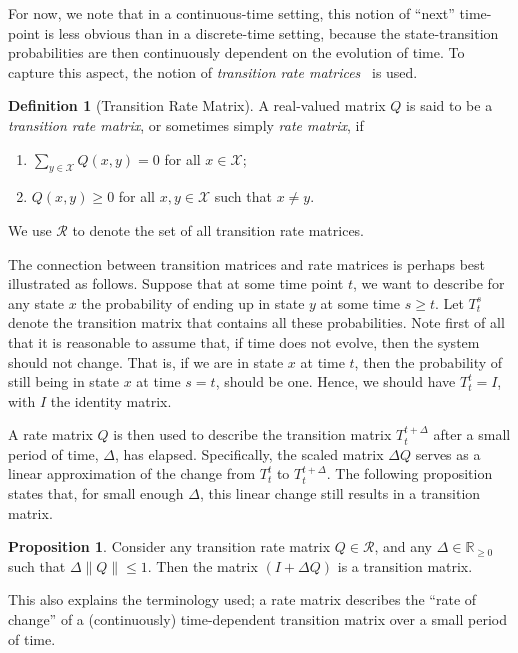 \documentclass[10pt,a4paper]{paper}
\theoremstyle{definition}
\newtheorem{proposition}[theorem]{Proposition}
\newtheorem{definition}{Definition}
\newcommand{\reals}{\mathbb{R}}
\newcommand{\realsnonneg}{\reals_{\geq 0}}
\newcommand{\states}{\mathcal{X}}
\newcommand{\norm}[1]{\left\lVert #1 \right\rVert}
\begin{document}
For now, we note that in a continuous-time setting, this notion of ``next'' time-point is less obvious than in a discrete-time setting, because the state-transition probabilities are then continuously dependent on the evolution of time. To capture this aspect, the notion of \emph{transition rate matrices}~\cite{norris1998markov} is used.
\begin{definition}[Transition Rate Matrix]\label{def:rate_matrix}
A real-valued matrix $Q$ is said to be a \emph{transition rate matrix}, or sometimes simply \emph{rate matrix}, if

\vspace{5pt}
\begin{enumerate}[label=R\arabic*:,ref=R\arabic*]
\item\label{def:Q:sumzero}
$\sum_{y\in\states}Q(x,y)=0$ for all $x\in\states$;
\item\label{def:Q:nonnegoffdiagonal}
$Q(x,y)\geq0$ for all $x,y\in\states$ such that $x\neq y$.
\end{enumerate}
\noindent
We use $\mathcal{R}$ to denote the set of all transition rate matrices. 
\vspace{5pt}
\end{definition}

The connection between transition matrices and rate matrices is perhaps best illustrated as follows. Suppose that at some time point $t$, we want to describe for any state $x$ the probability of ending up in state $y$ at some time $s\geq t$. Let $T_t^s$ denote the transition matrix that contains all these probabilities. Note first of all that it is reasonable to assume that, if time does not evolve, then the system should not change. That is, if we are in state $x$ at time $t$, then the probability of still being in state $x$ at time $s=t$, should be one. Hence, we should have $T_t^t=I$, with $I$ the identity matrix. 

A rate matrix $Q$ is then used to describe the transition matrix $T_t^{t+\Delta}$ after a small period of time, $\Delta$, has elapsed. Specifically, the scaled matrix $\Delta Q$ serves as a linear approximation of the change from $T_t^t$ to $T_t^{t+\Delta}$. The following proposition states that, for small enough $\Delta$, this linear change still results in a transition matrix.

\begin{proposition}\label{prop:stochastic_from_rate_matrix}
Consider any transition rate matrix $Q\in\mathcal{R}$, and any $\Delta\in\realsnonneg$ such that $\Delta \norm{Q}\leq 1$. Then the matrix $(I+\Delta Q)$ is a transition matrix.
\end{proposition}
This also explains the terminology used; a rate matrix describes the ``rate of change'' of a (continuously) time-dependent transition matrix over a small period of time.
\end{document}
